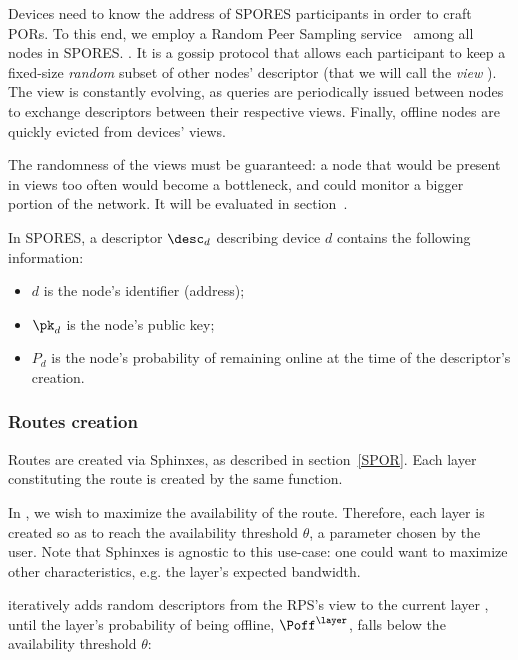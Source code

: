 Devices need to know the address of SPORES participants in order to craft PORs.
To this end, we employ a Random Peer Sampling service~\cite{Jelasity_Voulgaris_Guerraoui_Kermarrec_van_Steen_2007} among all nodes in SPORES. .
It is a gossip protocol that allows each participant to keep a fixed-size \emph{random} subset of other nodes' descriptor (that we will call the \emph{view} \rpsview). 
The view is constantly evolving, as queries are periodically issued between nodes to exchange descriptors between their respective views.
Finally, offline nodes are quickly evicted from devices' views.

The randomness of the views must be guaranteed: 
a node that would be present in views too often would become a bottleneck, and could monitor a bigger portion of the network.
It will be evaluated in section~.

In SPORES, a descriptor $\desc_d$ describing device $d$ contains the following information:
\begin{itemize}
  \item \(d\) is the node's identifier (address);
  \item \(\pk_d\) is the node's public key;
  \item \(P_d\) is the node's probability of remaining online at the time of the descriptor's creation.
\end{itemize}


\subsubsection{Routes creation}
\label{sssec:routes_creation}


Routes are created via Sphinxes, as described in section~\ref{SPOR}.
Each layer \layer constituting the route is created by the same \CreateLayer\xspace function.

In \name, we wish to maximize the availability of the route.
Therefore, each layer \layer is created so as to reach the availability threshold $\theta$, a parameter chosen by the user.
Note that Sphinxes is agnostic to this use-case: one could want to maximize other characteristics, e.g. the layer's expected bandwidth.

\CreateLayer\xspace iteratively adds random descriptors from the RPS's view \rpsview to the current layer \layer, until the layer's probability of being offline, $\Poff^\layer$, falls below the availability threshold $\theta$:

